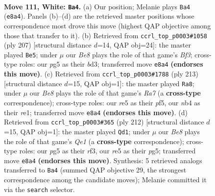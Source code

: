 \documentclass[11pt]{article}
\begin{document}
\clearpage

\begin{figure}[p]\centering
\begin{subfigure}{0.46\textwidth}\centering
\resizebox{\linewidth}{!}{%
\newchessgame
\chessboard[
  setfen={4B3/8/8/4rkp1/1n6/6K1/8/8 w - - 6 111},
  showmover=false,
  pgfstyle=straightmove, color=movearrow, markmove={e8-a4}
]}
\caption{}
\end{subfigure}\hfill
\begin{subfigure}{0.46\textwidth}\centering
\resizebox{\linewidth}{!}{%
\newchessgame
\chessboard[
  setfen={8/8/2R2b2/2K4n/8/1k1B4/8/8 b - - 48 104},
  showmover=false,
  pgfstyle=straightmove, color=movearrow, markmove={f6-e5}
]}
\caption{}
\end{subfigure}
\\[4pt]
\begin{subfigure}{0.46\textwidth}\centering
\resizebox{\linewidth}{!}{%
\newchessgame
\chessboard[
  setfen={8/7k/4K2P/5P2/8/8/r7/4R3 b - - 96 107},
  showmover=false,
  pgfstyle=straightmove, color=movearrow, markmove={a2-a8}
]}
\caption{}
\end{subfigure}\hfill
\begin{subfigure}{0.46\textwidth}\centering
\resizebox{\linewidth}{!}{%
\newchessgame
\chessboard[
  setfen={8/8/3K4/6p1/6k1/5r2/8/4Q3 w - - 10 107},
  showmover=false,
  pgfstyle=straightmove, color=movearrow, markmove={e1-d1}
]}
\caption{}
\end{subfigure}
\caption{\textbf{Move 111, White: \texttt{Ba4}.} (a) Our position; Melanie plays \texttt{Ba4} (\texttt{e8a4}). Panels (b)--(d) are the retrieved master positions whose correspondence most drove this move (highest QAP objective among those that transfer to it). (b) Retrieved from \texttt{ccrl\_top\_p0003\#1058} (ply 207) [structural distance $d$=14, QAP obj=24]: the master played \texttt{Be5}; under $\mu$ our \emph{Be8} plays the role of that game's \emph{Bf3}; cross-type roles: our \emph{p}g5 as their \emph{b}d3; transferred move \texttt{e8a4} \textbf{(endorses this move)}. (c) Retrieved from \texttt{ccrl\_top\_p0003\#1788} (ply 213) [structural distance $d$=15, QAP obj=1]: the master played \texttt{Ra8}; under $\mu$ our \emph{Be8} plays the role of that game's \emph{Ra7} (a \textbf{cross-type} correspondence); cross-type roles: our \emph{r}e5 as their \emph{p}f5, our \emph{n}b4 as their \emph{r}e1; transferred move \texttt{e8a4} \textbf{(endorses this move)}. (d) Retrieved from \texttt{ccrl\_top\_p0003\#365} (ply 212) [structural distance $d$=15, QAP obj=1]: the master played \texttt{Qd1}; under $\mu$ our \emph{Be8} plays the role of that game's \emph{Qe1} (a \textbf{cross-type} correspondence); cross-type roles: our \emph{p}g5 as their \emph{r}f3, our \emph{r}e5 as their \emph{p}g5; transferred move \texttt{e8a4} \textbf{(endorses this move)}. Synthesis: 5 retrieved analogs transferred to \texttt{Ba4} (summed QAP objective 29, the strongest correspondence among the candidate moves); Melanie committed it via the \texttt{search} selector.}
\label{fig:thought-m220}
\end{figure}
\end{document}

